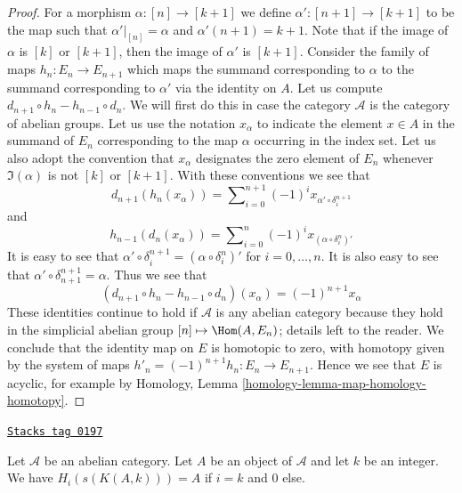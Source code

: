 \begin{proof}
For a morphism $\alpha : [n] \to [k + 1]$
we define $\alpha' : [n + 1] \to [k + 1]$ to be
the map such that $\alpha'|_{[n]} = \alpha$ and
$\alpha'(n + 1) = k + 1$. Note that if the
image of $\alpha$ is $[k]$ or $[k + 1]$, then
the image of $\alpha'$ is $[k + 1]$.
Consider the family of
maps $h_n : E_n \to E_{n + 1}$ which maps
the summand corresponding to $\alpha$ to
the summand corresponding to $\alpha'$ via
the identity on $A$.
Let us compute $d_{n + 1} \circ h_n - h_{n - 1} \circ d_n$.
We will first do this in case the category $\mathcal{A}$ is
the category of abelian groups.
Let us use the notation $x_\alpha$ to indicate
the element $x \in A$ in the summand of $E_n$ corresponding
to the map $\alpha$ occurring in the index set.
Let us also adopt the convention that
$x_\alpha$ designates the zero element of $E_n$
whenever $\Im(\alpha)$ is not $[k]$ or $[k + 1]$.
With these conventions we see that
$$
d_{n + 1}(h_n(x_\alpha)) =
\sum\nolimits_{i = 0}^{n + 1} (-1)^i x_{\alpha' \circ \delta^{n + 1}_i}
$$
and
$$
h_{n - 1}(d_n(x_\alpha)) =
\sum\nolimits_{i = 0}^n (-1)^i x_{(\alpha \circ \delta_i^n)'}
$$
It is easy to see that
$\alpha' \circ \delta^{n + 1}_i = (\alpha \circ \delta_i^n)'$
for $i = 0, \ldots, n$. It is also easy to see that
$\alpha' \circ \delta^{n + 1}_{n + 1} = \alpha$. Thus we
see that
$$
(d_{n + 1} \circ h_n - h_{n - 1} \circ d_n)(x_\alpha)
=
(-1)^{n + 1} x_\alpha
$$
These identities continue to hold if $\mathcal{A}$ is any abelian
category because they hold in the simplicial abelian group
$[n] \mapsto \Hom(A, E_n)$; details left to the reader.
We conclude that the identity map on $E$ is
homotopic to zero, with homotopy given by the
system of maps $h'_n = (-1)^{n + 1}h_n : E_n \to E_{n + 1}$.
Hence we see that $E$ is acyclic, for
example by Homology, Lemma \ref{homology-lemma-map-homology-homotopy}.
\end{proof}

\begin{lemma}
\label{simplicial-lemma-homology-eilenberg-maclane}
\href{https://stacks.math.columbia.edu/tag/0197}{\texttt{Stacks tag 0197}}

Let $\mathcal{A}$ be an abelian category.
Let $A$ be an object of $\mathcal{A}$ and
let $k$ be an integer. We have
$H_i(s(K(A, k))) = A$ if $i = k$ and
$0$ else.
\end{lemma}

